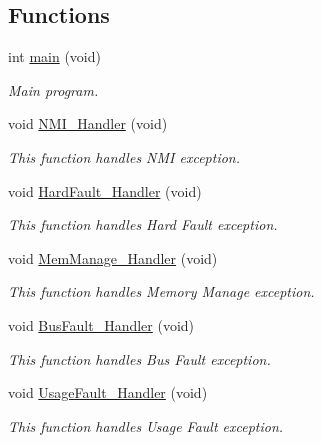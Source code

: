\subsection*{Functions}
\begin{DoxyCompactItemize}
\item 
int \hyperlink{group___f_l_a_s_h___write___protection_ga840291bc02cba5474a4cb46a9b9566fe}{main} (void)
\begin{DoxyCompactList}\small\item\em Main program. \end{DoxyCompactList}\item 
void \hyperlink{group___f_l_a_s_h___write___protection_ga6ad7a5e3ee69cb6db6a6b9111ba898bc}{N\-M\-I\-\_\-\-Handler} (void)
\begin{DoxyCompactList}\small\item\em This function handles N\-M\-I exception. \end{DoxyCompactList}\item 
void \hyperlink{group___f_l_a_s_h___write___protection_ga2bffc10d5bd4106753b7c30e86903bea}{Hard\-Fault\-\_\-\-Handler} (void)
\begin{DoxyCompactList}\small\item\em This function handles Hard Fault exception. \end{DoxyCompactList}\item 
void \hyperlink{group___f_l_a_s_h___write___protection_ga3150f74512510287a942624aa9b44cc5}{Mem\-Manage\-\_\-\-Handler} (void)
\begin{DoxyCompactList}\small\item\em This function handles Memory Manage exception. \end{DoxyCompactList}\item 
void \hyperlink{group___f_l_a_s_h___write___protection_ga850cefb17a977292ae5eb4cafa9976c3}{Bus\-Fault\-\_\-\-Handler} (void)
\begin{DoxyCompactList}\small\item\em This function handles Bus Fault exception. \end{DoxyCompactList}\item 
void \hyperlink{group___f_l_a_s_h___write___protection_ga1d98923de2ed6b7309b66f9ba2971647}{Usage\-Fault\-\_\-\-Handler} (void)
\begin{DoxyCompactList}\small\item\em This function handles Usage Fault exception. \end{DoxyCompactList}\item 

\end{DoxyCompactItemize}
